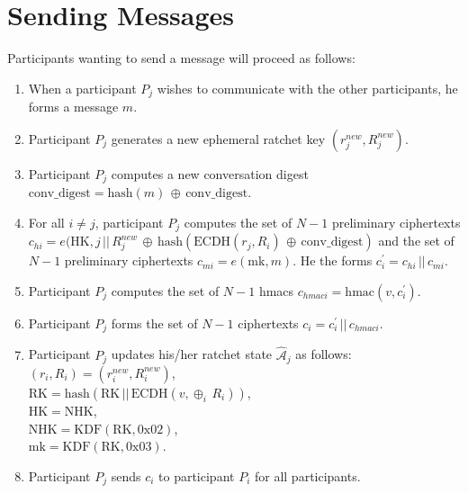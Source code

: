 \documentclass[%
preprint,
amsmath,amssymb,
aps,
prb,
floatfix,
]{revtex4-1}
\begin{document}
\section{\label{sec:sending}Sending Messages}
Participants wanting to send a message will proceed as follows:
\begin{enumerate}
\item When a participant $P_j$ wishes to communicate with the other
participants, he forms a message $m$.
\item Participant $P_j$ generates a new ephemeral ratchet key
$(r_j^{new},R_j^{new})$.
\item Participant $P_j$ computes a new conversation digest
$ \mathrm{conv\_digest} = \mathrm{hash}(m) \, \oplus \, \mathrm{conv\_digest}$.
\item For all $i \ne j$, participant $P_j$ computes the set of $N-1$ preliminary
ciphertexts $c_{hi} = e(\mathrm{HK}, j
\, || \, R_j^{new} \, \oplus \, \mathrm{hash}(\mathrm{ECDH}(r_j, R_i) \, \oplus
\, \mathrm{conv\_digest})$ and the
set of $N-1$ preliminary ciphertexts
$c_{mi} = e(\mathrm{mk}, m)$.
He the forms $c_i^\prime = c_{hi} \, || \, c_{mi}$.
\item Participant $P_j$ computes the set of $N-1$ hmacs $c_{hmaci} = \mathrm{hmac}(v, c_i^\prime)$.
\item Participant $P_j$ forms the set of $N-1$ ciphertexts $c_i = c_i^\prime \, || \, c_{hmaci}$.
\item Participant $P_j$ updates his/her ratchet state $\mathcal{\hat{A}}_j$ as
follows:\\
$(r_i, R_i) = (r_i^{new}, R_i^{new})$, \\
$\mathrm{RK} = \mathrm{hash}(\mathrm{RK} \, || \, \mathrm{ECDH}(v, \oplus_i
\, R_i))$, \\
$\mathrm{HK} = \mathrm{NHK}$, \\
$\mathrm{NHK} = \mathrm{KDF}(\mathrm{RK}, 0\mathrm{x}02)$, \\
$\mathrm{mk} = \mathrm{KDF}(\mathrm{RK}, 0\mathrm{x}03)$.
\item Participant $P_j$ sends $c_i $ to participant $P_i$ for all participants.
\end{enumerate}
\end{document}

